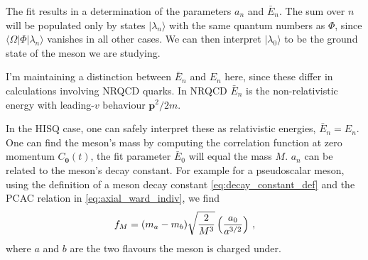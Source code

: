The fit results in a determination of the parameters $a_n$ and $\bar{E}_n$. The sum over $n$ will be populated only by states $|\lambda_n\rangle$ with the same quantum numbers as $\Phi$, since $\langle\Omega | \Phi | \lambda_n \rangle$ vanishes in all other cases. We can then interpret $|\lambda_0\rangle$ to be the ground state of the meson we are studying. 

I'm maintaining a distinction between $\bar{E}_n$ and $E_n$ here, since these differ in calculations involving NRQCD quarks. In NRQCD $\bar{E}_n$ is the non-relativistic energy with leading-$v$ behaviour ${\textbf{p}}^2/2m$.

In the HISQ case, one can safely interpret these as relativistic energies, $\bar{E}_n=E_n$. One can find the meson's mass by computing the correlation function at zero momentum $C_{{\textbf{0}}}(t)$, the fit parameter $\bar{E}_0$ will equal the mass $M$. $a_n$ can be related to the meson's decay constant. For example for a pseudoscalar meson, using the definition of a meson decay constant \eqref{eq:decay_constant_def} and the PCAC relation in \eqref{eq:axial_ward_indiv}, we find
\begin{align}
  f_M = (m_a-m_b) \sqrt{2\over M^3} \left({a_0\over a^{3/2}}\right)\,,
  \label{eq:decayconstant_pseudoscalar}
\end{align}
where $a$ and $b$ are the two flavours the meson is charged under.


